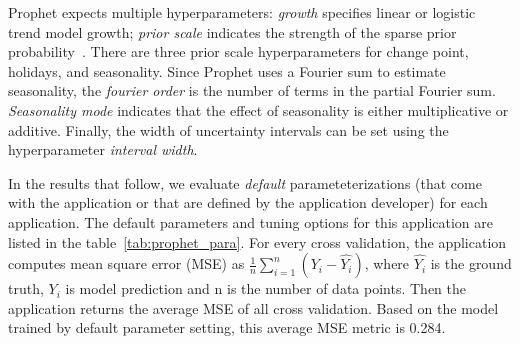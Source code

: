 
Prophet expects multiple hyperparameters: \textit{growth} specifies linear or logistic trend model growth; \textit{prior scale} indicates the strength of the 
sparse prior probability~\cite{ref:sparse_prior}. 
There are three prior scale hyperparameters for change point, holidays, and seasonality. 
Since Prophet uses a Fourier sum to estimate seasonality, 
the \textit{fourier order} is the number of terms in the partial Fourier 
sum. \textit{Seasonality mode} indicates that the effect of seasonality is either 
multiplicative or additive. Finally, the width of uncertainty intervals 
can be set using the hyperparameter \textit{interval width}.

In the results that follow, we evaluate \textit{default} parameteterizations (that come with 
the application or that are defined by the application developer) for each application.  
The default parameters and tuning options for this application are listed in the table~\ref{tab:prophet_para}. For every cross validation, the application computes mean square error (MSE) as $\frac{1}{n}\sum_{i=1}^{n}(Y_i - \hat{Y_i})$, where $\hat{Y_i}$ is the ground truth, $Y_i$ is model prediction and n is the number of data points. Then the application returns the average MSE of all cross validation. Based on the model trained by default parameter setting, this average MSE metric is 0.284.

\begin{table}[t]
\centering
\scriptsize
{}
\caption{The selected configurable hyperparameters of Prophet. The default value and tuning options are listed. 
\label{tab:prophet_para}}
\vspace{-0.2in}
\end{table}



